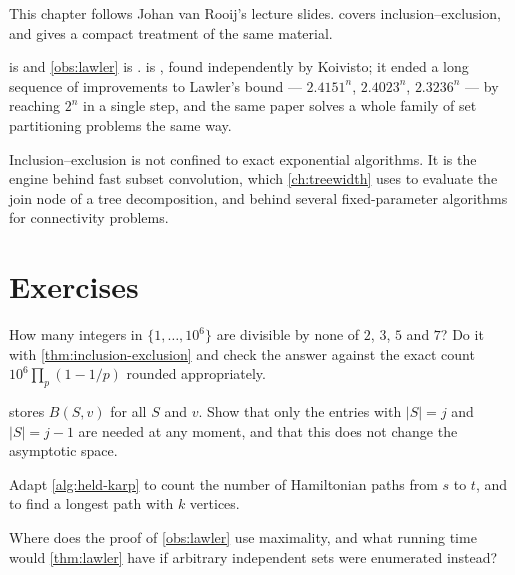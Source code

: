 This chapter follows Johan van Rooij's lecture slides.
\citet[Chapter~4]{FominKratsch2010} covers inclusion--exclusion, and
\citet[Section~10.1]{CyganEtAl2015} gives a compact treatment of the same
material.

 is \citet{HeldKarp1962} and \cref{obs:lawler} is
\citet{Lawler1976}.  is
\citet{BjorklundHusfeldtKoivisto2009}, found independently by Koivisto; it
ended a long sequence of improvements to Lawler's bound --- $2.4151^n$,
$2.4023^n$, $2.3236^n$ --- by reaching $2^n$ in a single step, and the same
paper solves a whole family of set partitioning problems the same way.

Inclusion--exclusion is not confined to exact exponential algorithms. It is the
engine behind fast subset convolution, which \cref{ch:treewidth} uses to
evaluate the join node of a tree decomposition, and behind several
fixed-parameter algorithms for connectivity problems.

\section{Exercises}
\label{sec:ex-exact-ii}

\begin{exercise}
How many integers in $\{1,\ldots,10^6\}$ are divisible by none of $2$, $3$, $5$
and $7$? Do it with \cref{thm:inclusion-exclusion} and check the answer against
the exact count $10^6 \prod_{p} (1 - 1/p)$ rounded appropriately.
\end{exercise}

\begin{exercise}
 stores $B(S,v)$ for all $S$ and $v$. Show that only the
entries with $|S| = j$ and $|S| = j-1$ are needed at any moment, and that this
does not change the asymptotic space.
\end{exercise}

\begin{exercise}
Adapt \cref{alg:held-karp} to count the number of Hamiltonian paths from $s$ to
$t$, and to find a longest path with $k$ vertices.
\end{exercise}

\begin{exercise}
Where does the proof of \cref{obs:lawler} use maximality, and what running time
would \cref{thm:lawler} have if arbitrary independent sets were enumerated
instead?
\end{exercise}

